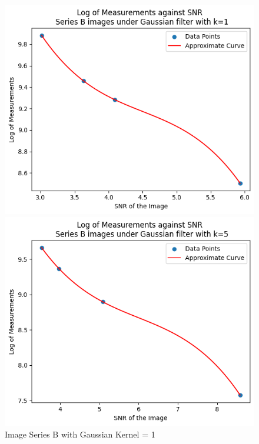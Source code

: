 \documentclass[runningheads]{llncs}
\begin{document}
\begin{figure}[h!]
\begin{minipage}[h]{0.47\linewidth}
\begin{center}
\includegraphics[width=1\linewidth]{Report/Result_Images/log_seriesB_Gaussian_1.png} 
\caption{Image Series B with Gaussian Kernel = 1}
\label{SeriesB_Log_Gaussian_1}
\end{center} 
\end{minipage}
\hfill
\vspace{0.2 cm}
\begin{minipage}[h]{0.47\linewidth}
\begin{center}
\includegraphics[width=1\linewidth]{Report/Result_Images/log_seriesB_Gaussian_5.png} 

\end{center}
\end{minipage}
\end{figure}
\end{document}
